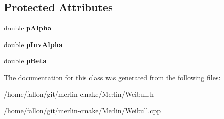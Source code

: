 \subsection*{Protected Attributes}
\begin{DoxyCompactItemize}
\item 
\mbox{\label{classWeibull_afb0dc2b8d8a78e4d4fd7a9db7cd656c2}} 
double {\bfseries p\+Alpha}
\item 
\mbox{\label{classWeibull_aa2c97994011a72e25b3d9fd8b30b6d7c}} 
double {\bfseries p\+Inv\+Alpha}
\item 
\mbox{\label{classWeibull_ab8747c260f117cb7119af0e7da6140cd}} 
double {\bfseries p\+Beta}
\end{DoxyCompactItemize}


The documentation for this class was generated from the following files\+:\begin{DoxyCompactItemize}
\item 
/home/fallon/git/merlin-\/cmake/\+Merlin/Weibull.\+h\item 
/home/fallon/git/merlin-\/cmake/\+Merlin/Weibull.\+cpp\end{DoxyCompactItemize}
